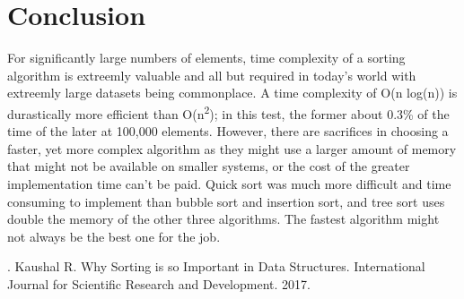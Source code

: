 \documentclass[conference]{IEEEtran}
\begin{document}
\section{Conclusion}
For significantly large numbers of elements, time complexity of a sorting algorithm is extreemly valuable and all but required in today's world with extreemly large datasets being commonplace. A time complexity of O(n log(n)) is durastically more efficient than O(n\textsuperscript{2}); in this test, the former about 0.3\% of the time of the later at 100,000 elements. However, there are sacrifices in choosing a faster, yet more complex algorithm as they might use a larger amount of memory that might not be available on smaller systems, or the cost of the greater implementation time can't be paid. Quick sort was much more difficult and time consuming to implement than bubble sort and insertion sort, and tree sort uses double the memory of the other three algorithms. The fastest algorithm might not always be the best one for the job.

\begin{thebibliography}{00}
 . Kaushal R. Why Sorting is so Important in Data Structures. International Journal for Scientific Research and Development. 2017.
\end{thebibliography}
\end{document}
